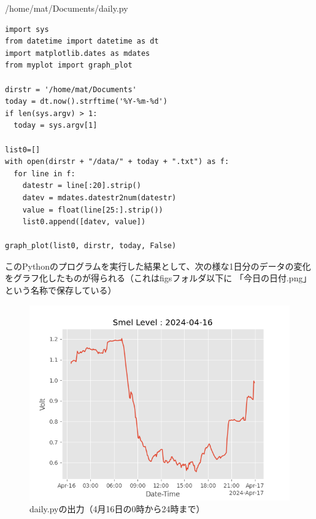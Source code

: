 \documentclass[12pt,a4paper,uplatex]{jsarticle}
\begin{document}
\begin{itembox}[l]{/home/mat/Documents/daily.py}
	\begin{verbatim}
import sys
from datetime import datetime as dt
import matplotlib.dates as mdates
from myplot import graph_plot

dirstr = '/home/mat/Documents'
today = dt.now().strftime('%Y-%m-%d')
if len(sys.argv) > 1:
  today = sys.argv[1]

list0=[]
with open(dirstr + "/data/" + today + ".txt") as f:
  for line in f:
    datestr = line[:20].strip()
    datev = mdates.datestr2num(datestr)
    value = float(line[25:].strip())
    list0.append([datev, value])

graph_plot(list0, dirstr, today, False)
	\end{verbatim}
\end{itembox}

\newpage

このPythonのプログラムを実行した結果として、次の様な1日分のデータの変化をグラフ化したものが得られる（これはfigsフォルダ以下に 「今日の日付.png」 という名称で保存している）

\begin{figure}[htbp]
	\begin{minipage}[b]{1.0\linewidth}
		\centering
		\includegraphics[keepaspectratio, scale=0.8]{figs/png/2024-04-16.png}
		\caption{daily.pyの出力（4月16日の0時から24時まで）}
	\end{minipage}
\end{figure}
\end{document}
